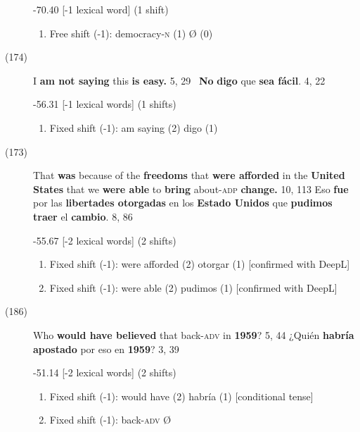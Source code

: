 \documentclass[output=paper]{langsci/langscibook}
\begin{document}
\begin{description}
    -70.40 [-1 lexical word] (1 shift)

    \begin{enumerate}
      \item Free shift (-1): democracy-\textsc{n} (1) \rightarrow Ø (0)
    \end{enumerate}

  \item[(174)] I \textbf{am not saying} this \textbf{is easy.} 5, 29 \ \rightarrow \textbf{No} \textbf{digo} que \textbf{sea fácil}. 4, 22

    -56.31 [-1 lexical words] (1 shifts)

    \begin{enumerate}
      \item Fixed shift (-1): am saying (2) \rightarrow digo (1)
    \end{enumerate}

  \item[(173)] That \textbf{was} because of the \textbf{freedoms} that \textbf{were afforded} in the \textbf{United States} that we \textbf{were able} to \textbf{bring} about\textsc{-adp} \textbf{change.} 10, 113 \rightarrow Eso \textbf{fue} por las \textbf{libertades otorgadas} en los \textbf{Estado Unidos} que \textbf{pudimos traer} el \textbf{cambio}. 8, 86

    -55.67 [-2 lexical words] (2 shifts)

    \begin{enumerate}
      \item Fixed shift (-1): were afforded (2) \rightarrow otorgar (1) [confirmed with DeepL]
      \item Fixed shift (-1): were able (2) \rightarrow pudimos (1) [confirmed with DeepL]
    \end{enumerate}

  \item[(186)] Who \textbf{would have believed} that back-\textsc{adv} in \textbf{1959}? 5, 44 \rightarrow ¿Quién \textbf{habría apostado} por eso en \textbf{1959}? 3, 39

    -51.14 [-2 lexical words] (2 shifts)

    \begin{enumerate}
      \item Fixed shift (-1): would have (2) \rightarrow habría (1) [conditional tense]
      \item Fixed shift (-1):\textbf{ }back-\textsc{adv} \rightarrow Ø
    \end{enumerate}


\end{description}
\end{document}
